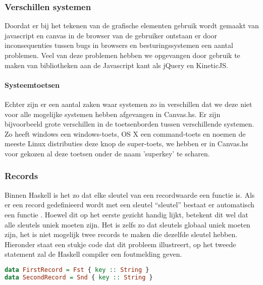\subsubsection{Verschillen systemen}
Doordat er bij het tekenen van de grafische elementen gebruik wordt gemaakt van javascript en canvas in de browser van de gebruiker ontstaan er door inconsequenties tussen bugs in browsers en besturingssystemen een aantal problemen. Veel van deze problemen hebben we opgevangen door gebruik te maken van bibliotheken aan de Javascript kant als jQuery en KineticJS. 

\paragraph{Systeemtoetsen} Echter zijn er een aantal zaken waar systemen zo in verschillen dat we deze niet voor alle mogelijke systemen hebben afgevangen in Canvas.hs. Er zijn bijvoorbeeld grote verschillen in de toetsenborden tussen verschillende systemen. Zo heeft windows een windows-toets, OS X een command-toets en noemen de meeste Linux distributies deze knop de super-toets, we hebben er in Canvas.hs voor gekozen al deze toetsen onder de naam 'superkey' te scharen.

\subsubsection{Records}
Binnen Haskell is het zo dat elke sleutel van een recordwaarde een functie is. Als er een record gedefinieerd wordt met een sleutel ``sleutel'' bestaat er automatisch een functie . Hoewel dit op het eerste gezicht handig lijkt, betekent dit wel dat alle sleutels uniek moeten zijn. Het is zelfs zo dat sleutels globaal uniek moeten zijn, het is niet mogelijk twee records te maken die dezelfde sleutel hebben. Hieronder staat een stukje code dat dit probleem illustreert, op het tweede statement zal de Haskell compiler een foutmelding geven.

\begin{lstlisting}[language=Haskell]
data FirstRecord = Fst { key :: String }
data SecondRecord = Snd { key :: String }
\end{lstlisting}


